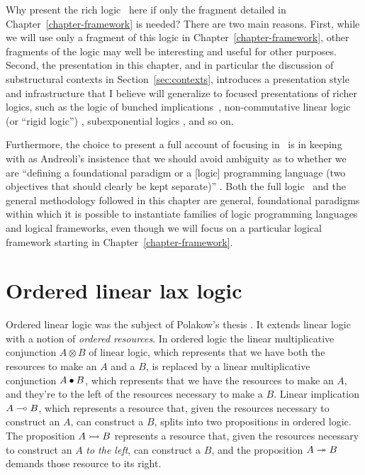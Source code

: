 Why present the rich logic \ollll~here
if only the fragment detailed in Chapter~\ref{chapter-framework} 
is needed? There are two
main reasons.  First, while we will use only a fragment of this logic
in Chapter~\ref{chapter-framework}, 
other fragments of the logic may well be interesting and
useful for other purposes. Second, the presentation in this chapter,
and in particular the discussion of substructural contexts in
Section~\ref{sec:contexts}, introduces a presentation style and
infrastructure that I believe will generalize to focused presentations
of richer logics, such as the logic of bunched
implications~\cite{pym02semantics}, non-commutative linear logic (or
``rigid logic'') \cite{simmons09linear}, subexponential logics
\cite{nigam09algorithmic}, and so on.

Furthermore, the choice to present a full account of focusing in
\ollll~is in keeping with as Andreoli's insistence that we should
avoid ambiguity as to whether we are ``defining a foundational
paradigm or a [logic] programming language (two objectives that should
clearly be kept separate)'' \cite{andreoli01focussing}. Both the full
logic \ollll~and the general methodology followed in this chapter are
general, foundational paradigms within which it is possible to
instantiate families of logic programming languages and logical
frameworks, even though we will focus on a particular logical
framework starting in Chapter~\ref{chapter-framework}.

\section{Ordered linear lax logic}
\label{sec:ord-unfocused}

Ordered linear logic was the subject of Polakow's thesis
\cite{polakow01ordered}. It extends linear logic with a notion of {\it
  ordered resources}.  In ordered logic the linear
multiplicative conjunction $A \otimes B$ of linear logic, which
represents that we have both the resources to make an $A$ and a $B$,
is replaced by a linear multiplicative conjunction $A \mathbin{\bullet} B$, which
represents that we have the resources to make an $A$, and they're to
the left of the resources necessary to make a $B$. Linear implication
$A \multimap B$, which represents a resource that, given the resources
necessary to construct an $A$, can construct a $B$, splits into two
propositions in ordered logic. The proposition $A \rightarrowtail B$ represents
a resource that, given the resources necessary to construct an $A$
{\it to the left}, can construct a $B$, and the proposition $A \twoheadrightarrow
B$ demands those resource to its right. 

